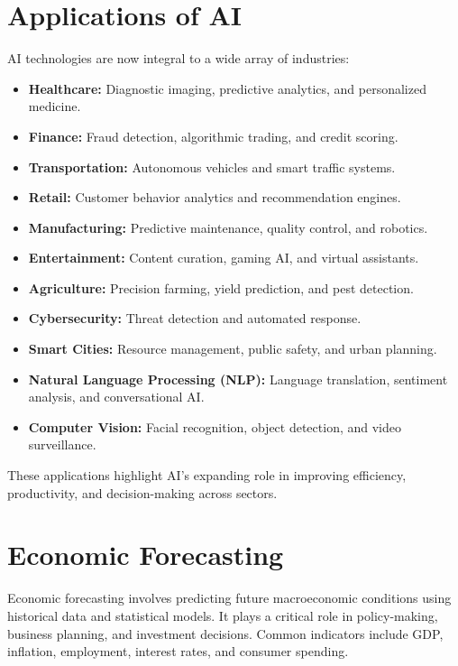 \section{Applications of AI}
\label{sec:applications-of-ai}

AI technologies are now integral to a wide array of industries:

\begin{itemize}
    \item \textbf{Healthcare:} Diagnostic imaging, predictive analytics, and personalized medicine.
    \item \textbf{Finance:} Fraud detection, algorithmic trading, and credit scoring.
    \item \textbf{Transportation:} Autonomous vehicles and smart traffic systems.
    \item \textbf{Retail:} Customer behavior analytics and recommendation engines.
    \item \textbf{Manufacturing:} Predictive maintenance, quality control, and robotics.
    \item \textbf{Entertainment:} Content curation, gaming AI, and virtual assistants.
    \item \textbf{Agriculture:} Precision farming, yield prediction, and pest detection.
    \item \textbf{Cybersecurity:} Threat detection and automated response.
    \item \textbf{Smart Cities:} Resource management, public safety, and urban planning.
    \item \textbf{Natural Language Processing (NLP):} Language translation, sentiment analysis, and conversational AI.
    \item \textbf{Computer Vision:} Facial recognition, object detection, and video surveillance.\\
    \citep{googleai-applications}
\end{itemize}

These applications highlight AI’s expanding role in improving efficiency, productivity, and decision-making across sectors.

\section{Economic Forecasting}
\label{sec:economic-forecasting}

Economic forecasting involves predicting future macroeconomic conditions using historical data and statistical models. It plays a critical role in policy-making, business planning, and investment decisions. Common indicators include GDP, inflation, employment, interest rates, and consumer spending.

